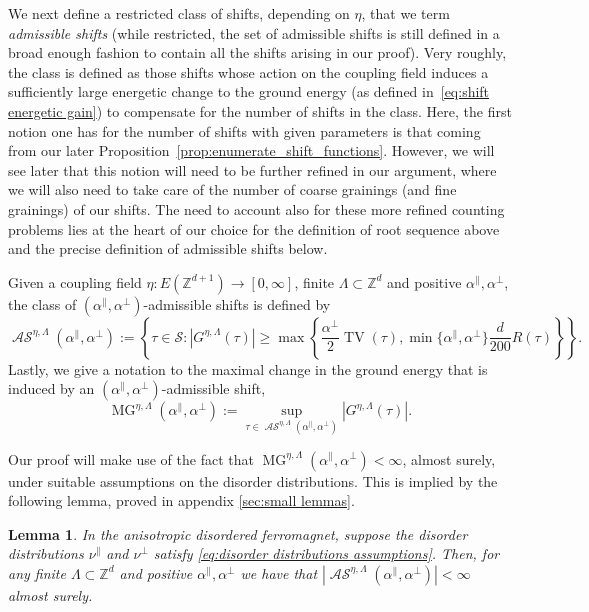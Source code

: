 \documentclass[11pt, reqno]{amsart}
\newtheorem{lemma}[theorem]{Lemma}
\newcommand{\Z}{\mathbb{Z}}
\DeclareMathOperator{\TV}{TV}
\DeclareMathOperator{\MG}{MG}
\DeclareMathOperator{\AS}{\mathcal{AS}}
\numberwithin{equation}{section}
\begin{document}
We next define a restricted class of shifts, depending on $\eta$, that we term \emph{admissible shifts} (while restricted, the set of admissible shifts is still defined in a broad enough fashion to contain all the shifts arising in our proof). Very roughly, the class is defined as those shifts whose action on the coupling field induces a sufficiently large energetic change to the ground energy (as defined in~\eqref{eq:shift energetic gain}) to compensate for the number of shifts in the class. Here, the first notion one has for the number of shifts with given parameters is that coming from our later Proposition~\ref{prop:enumerate_shift_functions}. However, we will see later that this notion will need to be further refined in our argument, where we will also need to take care of the number of coarse grainings (and fine grainings) of our shifts. The need to account also for these more refined counting problems lies at the heart of our choice for the definition of root sequence above and the precise definition of admissible shifts below.

Given a coupling field $\eta\colon E(\Z^{d+1})\to[0,\infty]$, finite $\Lambda\subset\Z^d$ and positive $\alpha^{\parallel},\alpha^{\perp}$, the class of $(\alpha^{\parallel},\alpha^{\perp})$-admissible shifts is defined by 
\begin{equation*}
\AS^{\eta,\Lambda}(\alpha^{\parallel},\alpha^{\perp}) := \left\{\tau\in{\mathcal S}\colon |G^{\eta,\Lambda}(\tau)| \geq \max\left\{\frac{\alpha^{\perp}}{2}\TV(\tau), \min \{ \alpha^{\parallel},\alpha^{\perp}\} \frac{d}{200}R(\tau)\right\}\right\}.
\end{equation*}
Lastly, we give a notation to the maximal change in the ground energy that is induced by an $(\alpha^{\parallel},\alpha^{\perp})$-admissible shift,
\begin{equation}\label{eq:MG def}
\MG^{\eta,\Lambda}(\alpha^{\parallel},\alpha^{\perp}):=\sup_{\tau \in \AS^{\eta,\Lambda} (\alpha^{\parallel},\alpha^{\perp})} |G^{\eta,\Lambda}(\tau)|.
\end{equation}

Our proof will make use of the fact that $\MG^{\eta,\Lambda}(\alpha^{\parallel},\alpha^{\perp})<\infty$, almost surely, under suitable assumptions on the disorder distributions. This is implied by the following lemma, proved in appendix \ref{sec:small lemmas}.

\begin{lemma}\label{lem:finite number of admissible shifts}
In the anisotropic disordered ferromagnet, suppose the disorder distributions
$\nu^{\parallel}$ and $\nu^{\perp}$ satisfy \eqref{eq:disorder distributions assumptions}.
Then, for any finite $\Lambda\subset\Z^d$ and positive $\alpha^{\parallel},\alpha^{\perp}$ we have that $|\AS^{\eta,\Lambda}(\alpha^{\parallel},\alpha^{\perp})|<\infty$ almost surely.
\end{lemma}
\end{document}
